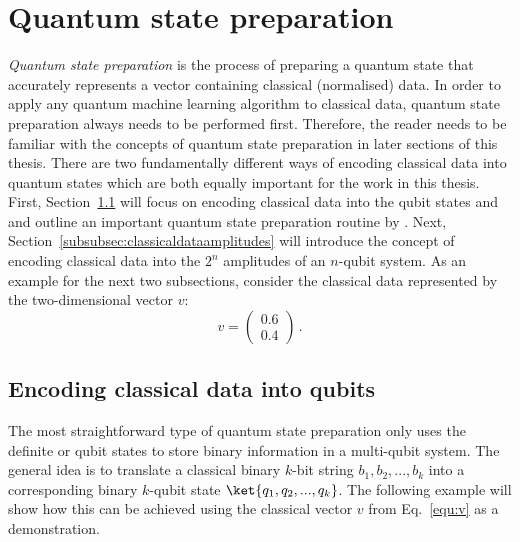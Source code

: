 \newpage
\section{Quantum state preparation}
\label{subsec:quantumstatepreparation}

\emph{Quantum state preparation} is the process of preparing a quantum state that accurately represents a vector containing classical (normalised) data. In order to apply any quantum machine learning algorithm to classical data, quantum state preparation always needs to be performed first. Therefore, the reader needs to be familiar with the concepts of quantum state preparation in later sections of this thesis. There are two fundamentally different ways of encoding classical data into quantum states which are both equally important for the work in this thesis. First, Section~\ref{subsubsec:classicaldataqubits} will focus on encoding classical data into the qubit states \0 and \1 and outline an important quantum state preparation routine by . Next, Section~\ref{subsubsec:classicaldataamplitudes} will introduce the concept of encoding classical data into the $2^n$ amplitudes of an $n$-qubit system. As an example for the next two subsections, consider the classical data represented by the two-dimensional vector $v$:
\begin{equation}
\label{equ:v}
v = \begin{pmatrix}0.6 \\ 0.4 \end{pmatrix}\, .
\end{equation}

\subsection{Encoding classical data into qubits}
\label{subsubsec:classicaldataqubits}
The most straightforward type of quantum state preparation only uses the definite \0 or \1 qubit states to store binary information in a multi-qubit system. The general idea is to translate a classical binary $k$-bit string $b_1,b_2,...,b_k$ into a corresponding binary $k$-qubit state $\ket{q_1,q_2,...,q_k}$. The following example will show how this can be achieved using the classical vector $v$ from Eq.~\ref{equ:v} as a demonstration.

